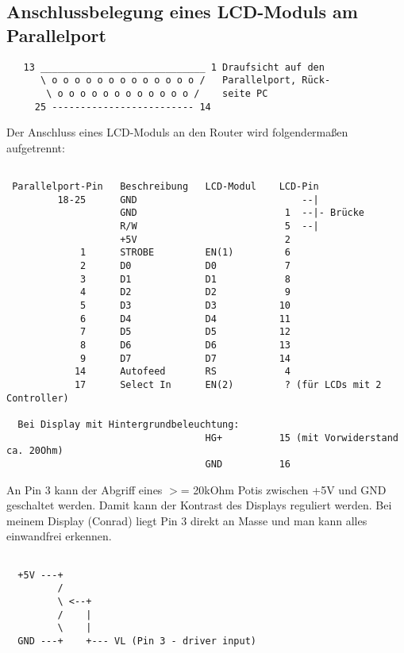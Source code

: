 \subsection{Anschlussbelegung eines LCD-Moduls am Parallelport}
 
\begin{example}
\begin{verbatim}
   13 _____________________________ 1 Draufsicht auf den
      \ o o o o o o o o o o o o o /   Parallelport, Rück-
       \ o o o o o o o o o o o o /    seite PC
     25 ------------------------- 14
\end{verbatim}
\end{example}
   

 Der Anschluss eines LCD-Moduls an den Router wird folgendermaßen aufgetrennt:

 
\begin{example}
\begin{verbatim}
 
 Parallelport-Pin   Beschreibung   LCD-Modul    LCD-Pin
         18-25      GND                             --|
                    GND                          1  --|- Brücke
                    R/W                          5  --|
                    +5V                          2
             1      STROBE         EN(1)         6
             2      D0             D0            7
             3      D1             D1            8
             4      D2             D2            9
             5      D3             D3           10
             6      D4             D4           11
             7      D5             D5           12
             8      D6             D6           13
             9      D7             D7           14
            14      Autofeed       RS            4
            17      Select In      EN(2)         ? (für LCDs mit 2 Controller)

  Bei Display mit Hintergrundbeleuchtung:
                                   HG+          15 (mit Vorwiderstand ca. 20Ohm)
                                   GND          16
\end{verbatim}
\end{example}

  An Pin 3 kann der Abgriff eines $>$= 20kOhm Potis zwischen +5V und GND 
  geschaltet werden. Damit kann der Kontrast des Displays reguliert werden.
  Bei meinem Display (Conrad) liegt Pin 3 direkt an Masse und man kann
  alles einwandfrei erkennen.

\begin{example}
\begin{verbatim}
  
  +5V ---+
         /
         \ <--+
         /    |
         \    |
  GND ---+    +--- VL (Pin 3 - driver input)
\end{verbatim}
\end{example}



